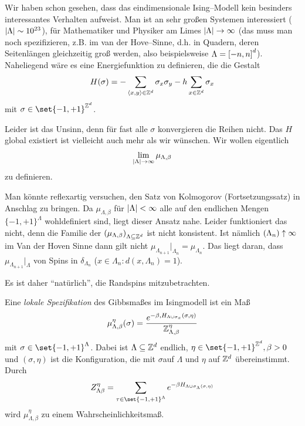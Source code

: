 Wir haben schon gesehen, dass das eindimensionale Ising--Modell kein besinders interessantes Verhalten aufweist. Man ist an sehr großen Systemen interessiert ($\lvert\Lambda\rvert \sim 10^{23}$), für Mathematiker und Physiker am Limes $\lvert\Lambda\rvert \to \infty$ (das muss man noch spezifizieren, z.B. im van der Hove--Sinne, d.h. in Quadern, deren Seitenlängen gleichzeitig groß werden, also beispielsweise $\Lambda = \left\lbrack-n,n\right\rbrack^d$). Naheliegend wäre es eine Energiefunktion zu definieren, die die Gestalt 
\begin{align}
	H(\sigma) = - \sum\limits_{\langle x,y\rangle \in \mathbb{Z}^d} \sigma_x \sigma_y - h \sum\limits_{x \in \mathbb{Z}^d} \sigma_x
\end{align}
mit $\sigma \in \set{-1,+1}^{\ZZ^d}$.

Leider ist das Unsinn, denn für fast alle $\sigma$ konvergieren die Reihen nicht. Das $H$ global existiert ist vielleicht auch mehr als wir wünschen. Wir wollen eigentlich 
\begin{align}
	\lim\limits_{\lvert\Lambda\rvert \to \infty} \mu_{\Lambda,\beta}
\end{align} 
zu definieren.

Man könnte reflexartig versuchen, den Satz von Kolmogorov (Fortsetzungssatz) in Anschlag zu bringen. Da $\mu_{\Lambda, \beta}$ für $\lvert\Lambda\rvert < \infty$ alle auf den endlichen Mengen $\{-1,+1\}^{\Lambda}$ wohldefiniert sind, liegt dieser Ansatz nahe. Leider funktioniert das nicht, denn die Familie der $\left(\mu_{\Lambda, \beta}\right)_{\Lambda \subseteq \mathbb{Z}^d}$ ist nicht konsistent. Ist nämlich $\left(\Lambda_n\right) \uparrow \infty$ im Van der Hoven Sinne dann gilt nicht $\mu_{\Lambda_{n+1}}|_{\Lambda_n} = \mu_{\Lambda_n}$. Das liegt daran, dass $\mu_{\Lambda_{n+1}}|_{\Lambda}$ von Spins in $\delta_{\Lambda_n}$ ($x \in \Lambda_{n} : d(x,\Lambda_n) = 1$).

Es ist daher \enquote{natürlich}, die Randspins mitzubetrachten.

\begin{definition}
	Eine \emph{lokale Spezifikation} des Gibbsmaßes im Isingmodell ist ein Maß
	\begin{align}
		\mu^{\eta}_{\Lambda, \beta} (\sigma) = \frac{e^{-\beta, H_{\Lambda \cup \sigma_x}(\sigma, \eta)}}{\mathbb{Z}^\eta_{\Lambda, \beta}}
	\end{align}
	mit $\sigma \in \set{-1,+1}^{\Lambda}$. Dabei ist $\Lambda \subseteq \mathbb{Z}^d$ endlich, $\eta \in \set{-1,+1}^{\ZZ^d} , \beta > 0$ und $(\sigma, \eta)$ ist die Konfiguration, die mit $\sigma$auf $\Lambda$ und $\eta$ auf $\mathbb{Z}^d$ übereinstimmt. Durch 
	\begin{align}
		Z^{\eta}_{\Lambda \beta} = \sum\limits_{\tau \in \set{-1,+1}^{\Lambda}} e^{- \beta H_{\Lambda \cup \sigma_{\Lambda} (\sigma, \eta) }}
	\end{align}
	wird $\mu^{\eta}_{\Lambda, \beta}$ zu einem Wahrscheinlichkeitsmaß.
\end{definition}

